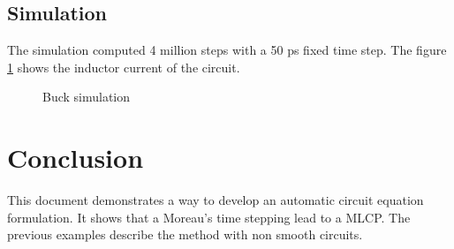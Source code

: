 \subsection{Simulation}

The simulation computed 4 million steps with a 50 ps fixed time step. The figure \ref{fig-Buck-sim} shows the inductor current of the circuit.

\begin {figure}[h]

\caption{Buck simulation}
\label{fig-Buck-sim}
\end {figure} 
\newpage




\section{Conclusion}
This document demonstrates a way to develop an automatic circuit equation formulation. It shows that a Moreau's time
stepping lead to a MLCP. The previous examples describe the method with non smooth circuits.


